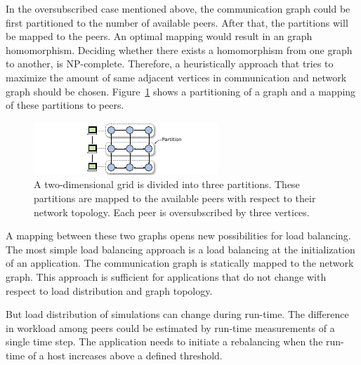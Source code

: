 In the oversubscribed case mentioned above, the communication graph could
be first partitioned to the number of available peers. After that, the
partitions will be mapped to the peers.  An optimal mapping would
result in an graph homomorphism. Deciding whether there exists a
homomorphism from one graph to another, is NP-complete. Therefore, a
heuristically approach that tries to maximize the amount of same
adjacent vertices in communication and network graph should be
chosen. Figure~\ref{fig:graph_partitioning} shows a partitioning of a
graph and a mapping of these partitions to peers.

\begin{figure}[H]
  \centering \includegraphics[width=\textwidth]{graphics/60_graph_partitioning}
  \caption{A two-dimensional grid is divided into three partitions.
    These partitions are mapped to the available peers with respect
    to their network topology. Each peer is oversubscribed by three
    vertices.}
  \label{fig:graph_partitioning}
\end{figure}

\noindent A mapping between these two graphs opens new possibilities for
load balancing.  The most simple load balancing approach is a load
balancing at the initialization of an application. The communication
graph is statically mapped to the network graph. This
approach is sufficient for applications that do not change with
respect to load distribution and graph topology.

But load distribution of simulations can change during run-time. The
difference in workload among peers could be estimated by run-time
measurements of a single time step. The application needs to initiate
a rebalancing when the run-time of a host increases above a defined
threshold.

